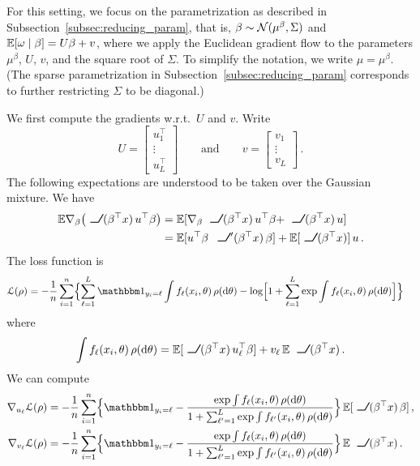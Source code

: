 \documentclass{custom}
\begin{document}
For this setting, we focus on the parametrization as described in Subsection~\ref{subsec:reducing_param}, that is, $\beta \sim \mathcal N(\mu^\beta, \Sigma)$ and $\mathbb E[\omega \mid \beta] = U\beta + v$, where we apply the Euclidean gradient flow to the parameters $\mu^\beta$, $U$, $v$, and the square root of $\Sigma$.
To simplify the notation, we write $\mu = \mu^\beta$.
(The sparse parametrization in Subsection~\ref{subsec:reducing_param} corresponds to further restricting $\Sigma$ to be diagonal.)

We first compute the gradients w.r.t.\ $U$ and $v$. Write
\[
U=\begin{bmatrix}
u_{1}^{\top}\\
\vdots\\
u_{L}^{\top}
\end{bmatrix}\qquad\text{and}\qquad v=\begin{bmatrix}
v_{1}\\
\vdots\\
v_{L}
\end{bmatrix}\,.
\]
The following expectations are understood to be taken over the Gaussian mixture. We have
\begin{align*}
    \mathbb{E}\nabla_{\beta}\bigl(\ReLU(\beta^\top x )\,u^{\top}\beta\bigr)
    &=\mathbb{E}[\nabla_{\beta} \ReLU(\beta^\top x )\,u^{\top}\beta+\ReLU(\beta^\top x )\,u] \\
    &=\mathbb{E}[u^{\top}\beta\,\ReLU'(\beta^\top x)\,\beta]+\mathbb{E}[\ReLU(\beta^\top x )]\,u\,.
\end{align*}
The loss function is
\begin{align*}
\loss(\rho) & =-\frac{1}{n}\sum_{i=1}^{n}\Bigl\{ \sum_{\ell=1}^{L}\ind_{y_i=\ell}\int f_{\ell}(x_{i},\theta)\,\rho(\D\theta)-\log\Bigl[1+\sum_{\ell=1}^{L}\exp\int f_{\ell}(x_{i},\theta)\,\rho(\D\theta)\Bigr]\Bigr\} 
\end{align*}
where
\[
\int f_{\ell}(x_{i},\theta)\,\rho(\D\theta)
=\mathbb{E}[\ReLU(\beta^\top x ) \,u_{\ell}^{\top}\beta]+v_{\ell}\,\mathbb{E} \ReLU(\beta^\top x )\,.
\]
We can compute
\begin{align*}
\nabla_{u_{\ell}}\loss(\rho) & =-\frac{1}{n}\sum_{i=1}^{n}\Bigl\{ \ind_{y_{i}=\ell}-\frac{\exp\int f_{\ell}(x_{i},\theta)\,\rho(\D\theta)}{1+\sum_{\ell'=1}^{L}\exp\int f_{\ell'}(x_{i},\theta)\,\rho(\D\theta)}\Bigr\}\, \mathbb{E}[\ReLU(\beta^\top x )\,\beta]\,,\\
\nabla_{v_{\ell}}\loss(\rho) & =-\frac{1}{n}\sum_{i=1}^{n}\Bigl\{ \ind_{y_{i}=\ell}-\frac{\exp\int f_{\ell}(x_{i},\theta)\,\rho(\D\theta)}{1+\sum_{\ell'=1}^{L}\exp\int f_{\ell'}(x_{i},\theta)\,\rho(\D\theta)}\Bigr\}\, \mathbb{E}\ReLU(\beta^\top x)\,.
\end{align*}
\end{document}
